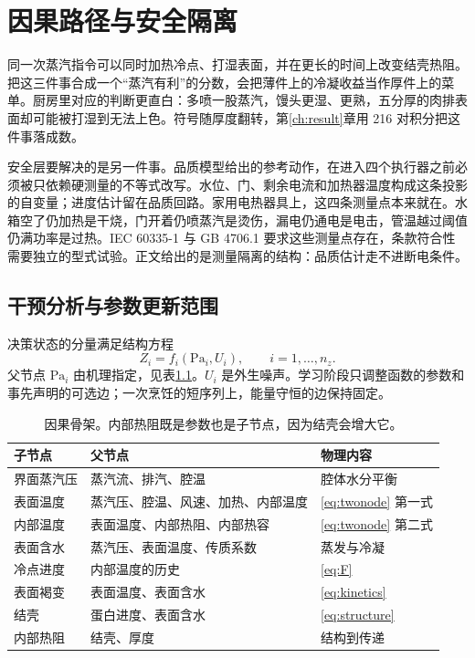 \chapter{因果路径与安全隔离}
\label{ch:safe}

同一次蒸汽指令可以同时加热冷点、打湿表面，并在更长的时间上改变结壳热阻。把这三件事合成一个“蒸汽有利”的分数，会把薄件上的冷凝收益当作厚件上的菜单。厨房里对应的判断更直白：多喷一股蒸汽，馒头更湿、更熟，五分厚的肉排表面却可能被打湿到无法上色。符号随厚度翻转，第\ref{ch:result}章用 216 对积分把这件事落成数。

安全层要解决的是另一件事。品质模型给出的参考动作，在进入四个执行器之前必须被只依赖硬测量的不等式改写。水位、门、剩余电流和加热器温度构成这条投影的自变量；进度估计留在品质回路。家用电热器具上，这四条测量点本来就在。水箱空了仍加热是干烧，门开着仍喷蒸汽是烫伤，漏电仍通电是电击，管温越过阈值仍满功率是过热。IEC 60335-1 与 GB 4706.1 要求这些测量点存在，条款符合性需要独立的型式试验。正文给出的是测量隔离的结构：品质估计走不进断电条件。

\section{干预分析与参数更新范围}

决策状态的分量满足结构方程
\begin{equation}
\label{eq:scm}
Z_i=f_i(\mathrm{Pa}_i,U_i),\qquad i=1,\ldots,n_z.
\end{equation}
父节点 \(\mathrm{Pa}_i\) 由机理指定，见表\ref{tab:scm}。\(U_i\) 是外生噪声。学习阶段只调整函数的参数和事先声明的可选边；一次烹饪的短序列上，能量守恒的边保持固定。

\begin{table}[htbp]
\centering
\caption{因果骨架。内部热阻既是参数也是子节点，因为结壳会增大它。}
\label{tab:scm}
\begin{tabularx}{\textwidth}{llX}
\toprule
子节点 & 父节点 & 物理内容 \\
\midrule
界面蒸汽压 & 蒸汽流、排汽、腔温 & 腔体水分平衡 \\
表面温度 & 蒸汽压、腔温、风速、加热、内部温度 & \eqref{eq:twonode} 第一式 \\
内部温度 & 表面温度、内部热阻、内部热容 & \eqref{eq:twonode} 第二式 \\
表面含水 & 蒸汽压、表面温度、传质系数 & 蒸发与冷凝 \\
冷点进度 & 内部温度的历史 & \eqref{eq:F} \\
表面褐变 & 表面温度、表面含水 & \eqref{eq:kinetics} \\
结壳 & 蛋白进度、表面含水 & \eqref{eq:structure} \\
内部热阻 & 结壳、厚度 & 结构到传递 \\
\bottomrule
\end{tabularx}
\end{table}

